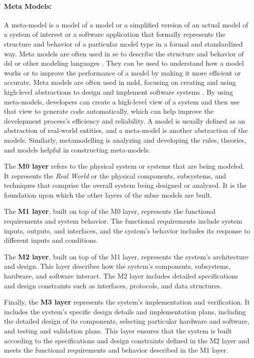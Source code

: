 \paragraph{Meta Models:} 
A meta-model is a model of a model or a simplified version of an actual model of a system of interest or a software application that formally represents the structure and behavior of a particular model type in a formal and standardized way.
Meta models are often used in \ac{se} to describe the structure and behavior of \ac{dsl} or other modeling languages \cite{misc:metamodels:dsl}.
They can be used to understand how a model works or to improve the performance of a model by making it more efficient or accurate. 
Meta models are often used in \ac{mdd}, focusing on creating and using high-level abstractions to design and implement software systems \cite{misc:metamodels:mdd}. 
By using meta-models, developers can create a high-level view of a system and then use that view to generate code automatically, which can help improve the development process's efficiency and reliability.
A model is usually defined as an abstraction of real-world entities, and a meta-model is another abstraction of the models. 
Similarly, metamodelling is analyzing and developing the rules, theories, and models helpful in constructing meta-models.

The \textbf{M0 layer} refers to the physical system or systems that are being modeled. 
It represents the \textit{Real World} or the physical components, subsystems, and techniques that comprise the overall system being designed or analyzed. 
It is the foundation upon which the other layers of the \ac{mbse} models are built.

The \textbf{M1 layer}, built on top of the M0 layer, represents the functional requirements and system behavior.
The functional requirements include system inputs, outputs, and interfaces, and the system's behavior includes its response to different inputs and conditions.

The \textbf{M2 layer}, built on top of the M1 layer, represents the system's architecture and design. 
This layer describes how the system's components, subsystems, hardware, and software interact.
The M2 layer includes detailed specifications and design constraints such as interfaces, protocols, and data structures.

Finally, the \textbf{M3 layer} represents the system's implementation and verification. 
It includes the system's specific design details and implementation plans, including the detailed design of its components, selecting particular hardware and software, and testing and validation plans. 
This layer ensures that the system is built according to the specifications and design constraints defined in the M2 layer and meets the functional requirements and behavior described in the M1 layer.

